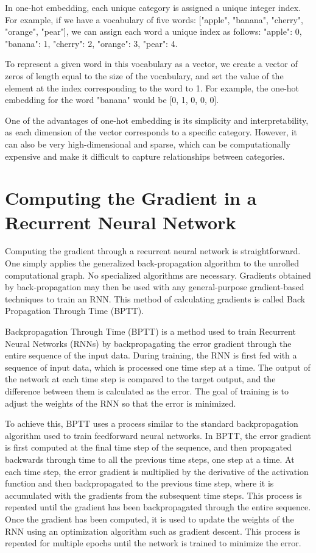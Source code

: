 \documentclass{report}
\begin{document}
In one-hot embedding, each unique category is assigned a unique integer index. For example, if we have a vocabulary of five words: ["apple", "banana", "cherry", "orange", "pear"], we can assign each word a unique index as follows: {"apple": 0, "banana": 1, "cherry": 2, "orange": 3, "pear": 4}.

To represent a given word in this vocabulary as a vector, we create a vector of zeros of length equal to the size of the vocabulary, and set the value of the element at the index corresponding to the word to 1. For example, the one-hot embedding for the word "banana" would be [0, 1, 0, 0, 0].

One of the advantages of one-hot embedding is its simplicity and interpretability, as each dimension of the vector corresponds to a specific category. However, it can also be very high-dimensional and sparse, which can be computationally expensive and make it difficult to capture relationships between categories.

\section{Computing the Gradient in a Recurrent Neural Network}
Computing the gradient through a recurrent neural network is straightforward. One simply applies the generalized back-propagation algorithm to the unrolled computational graph. No specialized algorithms are necessary. Gradients obtained by back-propagation may then be used with any general-purpose gradient-based techniques to train an RNN. This method of calculating gradients is called Back Propagation Through Time (BPTT).

Backpropagation Through Time (BPTT) is a method used to train Recurrent Neural Networks (RNNs) by backpropagating the error gradient through the entire sequence of the input data. During training, the RNN is first fed with a sequence of input data, which is processed one time step at a time. The output of the network at each time step is compared to the target output, and the difference between them is calculated as the error. The goal of training is to adjust the weights of the RNN so that the error is minimized.

To achieve this, BPTT uses a process similar to the standard backpropagation algorithm used to train feedforward neural networks. In BPTT, the error gradient is first computed at the final time step of the sequence, and then propagated backwards through time to all the previous time steps, one step at a time. At each time step, the error gradient is multiplied by the derivative of the activation function and then backpropagated to the previous time step, where it is accumulated with the gradients from the subsequent time steps. This process is repeated until the gradient has been backpropagated through the entire sequence. Once the gradient has been computed, it is used to update the weights of the RNN using an optimization algorithm such as gradient descent. This process is repeated for multiple epochs until the network is trained to minimize the error.
\end{document}
